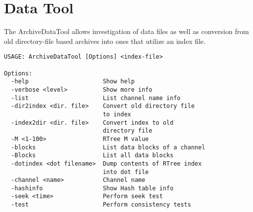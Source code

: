 \section{Data Tool}
The ArchiveDataTool allows investigation of data files as well as
conversion from old directory-file based archives into ones that
utilize an index file.

\begin{lstlisting}[frame=none,keywordstyle=\sffamily] 
USAGE: ArchiveDataTool [Options] <index-file>
 
Options:
  -help                     Show help
  -verbose <level>          Show more info
  -list                     List channel name info
  -dir2index <dir. file>    Convert old directory file
                            to index
  -index2dir <dir. file>    Convert index to old
                            directory file
  -M <1-100>                RTree M value
  -blocks                   List data blocks of a channel
  -Blocks                   List all data blocks
  -dotindex <dot filename>  Dump contents of RTree index
                            into dot file
  -channel <name>           Channel name
  -hashinfo                 Show Hash table info
  -seek <time>              Perform seek test
  -test                     Perform consistency tests
\end{lstlisting}
